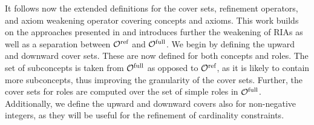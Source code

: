 
It follows now the extended definitions for the cover sets, refinement operators, and axiom weakening operator covering \SROIQ concepts and axioms. This work builds on the approaches presented in \cite{confalonieri2020towards} and introduces further the weakening of RIAs as well as a separation between ${\mathcal{O}^\textnormal{ref}}$ and ${\mathcal{O}^\textnormal{full}}$. We begin by defining the upward and downward cover sets. These are now defined for both concepts and roles. The set of subconcepts is taken from ${\mathcal{O}^\textnormal{full}}$ as opposed to ${\mathcal{O}^\textnormal{ref}}$, as it is likely to contain more subconcepts, thus improving the granularity of the cover sets. Further, the cover sets for roles are computed over the set of simple roles in ${\mathcal{O}^\textnormal{full}}$. Additionally, we define the upward and downward covers also for non-negative integers, as they will be useful for the refinement of cardinality constraints.

